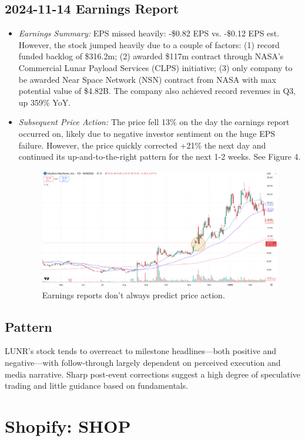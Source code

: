 \documentclass[11pt]{article}
\begin{document}
    \subsection{2024-11-14 Earnings Report}
        \begin{itemize}
            \item \textit{Earnings Summary:} EPS missed heavily: -\$0.82 EPS vs. -\$0.12 EPS est. However, the stock jumped heavily due to a couple of factors: (1) record funded backlog of \$316.2m; (2) awarded \$117m contract through NASA's Commercial Lunar Payload Services (CLPS) initiative; (3) only company to be awarded Near Space Network (NSN) contract from NASA with max potential value of \$4.82B. The company also achieved record revenues in Q3, up 359\% YoY.
            \item \textit{Subsequent Price Action:} The price fell 13\% on the day the earnings report occurred on, likely due to negative investor sentiment on the huge EPS failure. However, the price quickly corrected +21\% the next day and continued its up-and-to-the-right pattern for the next 1-2 weeks. See Figure 4.
            \begin{figure}[h]
                \centering \includegraphics[width=0.8\linewidth]{images/LUNR2.png}
                \caption{Earnings reports don't always predict price action.}
            \end{figure}
        \end{itemize}
        \subsection{Pattern}
        LUNR’s stock tends to overreact to milestone headlines—both positive and negative—with follow-through largely dependent on perceived execution and media narrative. Sharp post-event corrections suggest a high degree of speculative trading and little guidance based on fundamentals.
\section{Shopify: SHOP}
\end{document}
